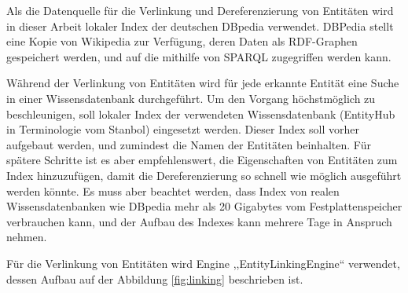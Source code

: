Als die Datenquelle für die Verlinkung und Dereferenzierung von Entitäten wird in dieser Arbeit lokaler Index der deutschen DBpedia\cite{auer2007dbpedia} verwendet. DBPedia stellt eine Kopie von Wikipedia zur Verfügung, deren Daten als RDF-Graphen gespeichert werden, und auf die mithilfe von SPARQL zugegriffen werden kann.

Während der Verlinkung von Entitäten wird für jede erkannte Entität eine Suche in einer Wissensdatenbank durchgeführt. Um den Vorgang höchstmöglich zu beschleunigen, soll lokaler Index der verwendeten Wissensdatenbank (EntityHub in Terminologie vom Stanbol) eingesetzt werden. Dieser Index soll vorher aufgebaut werden, und zumindest die Namen der Entitäten beinhalten. Für spätere Schritte ist es aber empfehlenswert, die Eigenschaften von Entitäten zum Index hinzuzufügen, damit die Dereferenzierung so schnell wie möglich ausgeführt werden könnte. Es muss aber beachtet werden, dass Index von realen Wissensdatenbanken wie DBpedia mehr als 20 Gigabytes vom Festplattenspeicher verbrauchen kann, und der Aufbau des Indexes kann mehrere Tage in Anspruch nehmen.

Für die Verlinkung von Entitäten wird Engine ,,EntityLinkingEngine`` verwendet, dessen Aufbau auf der Abbildung \ref{fig:linking} beschrieben ist.

